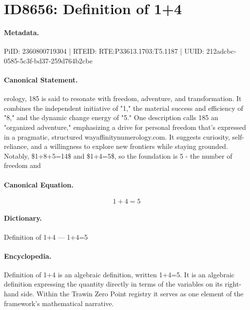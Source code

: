 \section*{ID8656: Definition of 1+4}
\paragraph{Metadata.}
PiID: 2360800719304 | RTEID: RTE:P33613.1703:T5.1187 | UUID: 212adcbc-0585-5c3f-bd37-259d764b2cbe

\paragraph{Canonical Statement.}
erology, 185 is said to resonate with freedom, adventure, and transformation. It combines the independent initiative of "1," the material success and efficiency of "8," and the dynamic change energy of "5." One description calls 185 an "organized adventure," emphasizing a drive for personal freedom that's expressed in a pragmatic, structured wayaffinitynumerology.com. It suggests curiosity, self-reliance, and a willingness to explore new frontiers while staying grounded. Notably, \$1+8+5=14\$ and \$1+4=5\$, so the foundation is 5 - the number of freedom and

\paragraph{Canonical Equation.}
\[
1+4=5
\]

\paragraph{Dictionary.}
Definition of 1+4 — 1+4=5

\paragraph{Encyclopedia.}
Definition of 1+4 is an algebraic definition, written 1+4=5. It is an algebraic definition expressing the quantity directly in terms of the variables on its right-hand side. Within the Trawin Zero Point registry it serves as one element of the framework's mathematical narrative.
